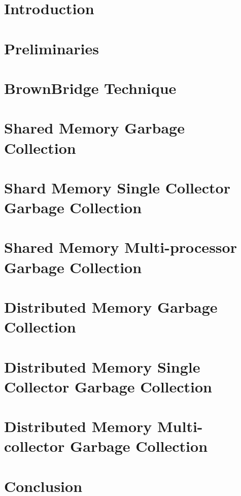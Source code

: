 \documentclass[12pt,letterpaper]{report}
\begin{document}
\begin{doublespace}
\begin{comment}
 
%

\end{comment}

\chapter{Introduction}
\chapter{Preliminaries}
\chapter{BrownBridge Technique}
\chapter {Shared Memory Garbage Collection}
\chapter {Shard Memory Single Collector Garbage Collection} 
  \chapter{Shared Memory Multi-processor Garbage Collection}
 \label{shared}
   
\chapter{Distributed Memory Garbage Collection}
\chapter{Distributed Memory Single Collector Garbage Collection}
  \chapter{Distributed Memory Multi-collector Garbage Collection}
     \label{distributed}
     
\chapter{Conclusion}
\begin{comment}
 \chapter{Document Retrieval with Forbidden Extension}
 \label{forbidext}
 


\end{comment}
\end{doublespace}
\end{document}
